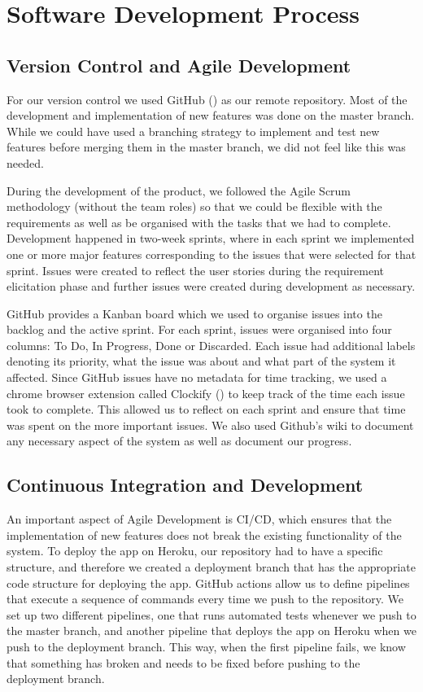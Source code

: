 \documentclass{l4proj}
\begin{document}
\section{Software Development Process}

\subsection{Version Control and Agile Development}
For our version control we used GitHub (\cite{github}) as our remote repository. Most of the development and implementation of new features was done on the master branch. While we could have used a branching strategy to implement and test new features before merging them in the master branch, we did not feel like this was needed.

During the development of the product, we followed the Agile Scrum methodology (without the team roles) so that we could be flexible with the requirements as well as be organised with the tasks that we had to complete. Development happened in two-week sprints, where in each sprint we implemented one or more major features corresponding to the issues that were selected for that sprint. Issues were created to reflect the user stories during the requirement elicitation phase and further issues were created during development as necessary. 

GitHub provides a Kanban board which we used to organise issues into the backlog and the active sprint. For each sprint, issues were organised into four columns: To Do, In Progress, Done or Discarded. Each issue had additional labels denoting its priority, what the issue was about and what part of the system it affected. Since GitHub issues have no metadata for time tracking, we used a chrome browser extension called Clockify (\cite{clock}) to keep track of the time each issue took to complete. This allowed us to reflect on each sprint and ensure that time was spent on the more important issues. We also used Github's wiki to document any necessary aspect of the system as well as document our progress.

\subsection{Continuous Integration and Development}
An important aspect of Agile Development is CI/CD, which ensures that the implementation of new features does not break the existing functionality of the system. To deploy the app on Heroku, our repository had to have a specific structure, and therefore we created a deployment branch that has the appropriate code structure for deploying the app. GitHub actions allow us to define pipelines that execute a sequence of commands every time we push to the repository. We set up two different pipelines, one that runs automated tests whenever we push to the master branch, and another pipeline that deploys the app on Heroku when we push to the deployment branch. This way, when the first pipeline fails, we know that something has broken and needs to be fixed before  pushing to the deployment branch.
\end{document}
